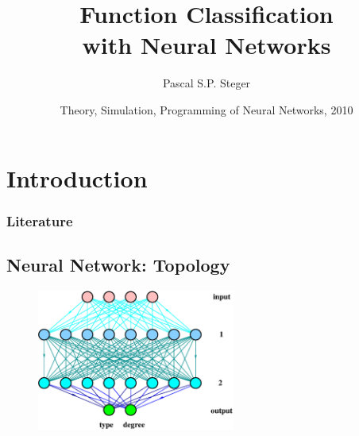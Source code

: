 \documentclass{beamer}
\title{Function Classification \\with Neural Networks}
\author{Pascal S.P. Steger}
\date[10. 08. 2010]{Theory, Simulation, Programming of Neural Networks, 2010}
\begin{document}
%
\begin{frame}
    \titlepage
\end{frame}
%
%
\section{Introduction}
%
\begin{frame}
    \tableofcontents
\end{frame}
%
\begin{frame}
\frametitle{Literature}
    
    
	\hfill\vfill
	\cite{Stoop2010}
	\cite{Rojas1996}
	\cite{Laemmel2004}
	\cite{Jones1990}
\end{frame}
%

\subsection{Neural Network: Topology}
\begin{frame}
	\begin{figure}
		\centering
		\includegraphics[width=6.5cm]{fig/network_topology.eps}
	\end{figure}
\end{frame}
\end{document}
